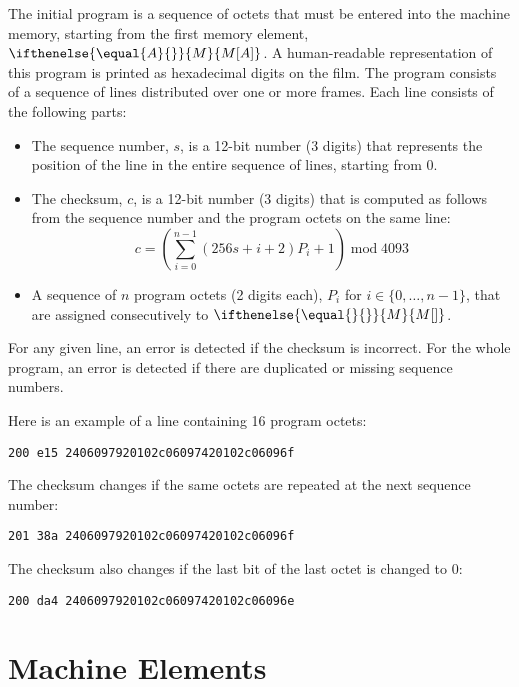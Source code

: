 \documentclass[a4paper,12pt]{article}
\newcommand{\MEM}[1]{\ifthenelse{\equal{#1}{}}{M}{M[#1]}}
\newcommand{\range}[2]{\{#1,\ldots,#2\}}
\DeclareMathOperator{\MOD}{mod}
\newcommand{\modulo}[2]{#1 \MOD #2}
\theoremstyle{definition}
\begin{document}
The initial program is a sequence of octets that must be entered into the machine memory, starting from the first memory element, $\MEM{A}$.
A human-readable representation of this program is printed as hexadecimal digits on the film.
The program consists of a sequence of lines distributed over one or more frames.
Each line consists of the following parts:
\begin{itemize}
\item The sequence number, $s$, is a 12-bit number (3 digits) that represents the position of the line in the entire sequence of lines, starting from 0.
\item The checksum, $c$, is a 12-bit number (3 digits) that is computed as follows from the sequence number and the program octets on the same line:
  \[ c = \modulo{\left ( \sum_{i=0}^{n-1} (256 s + i + 2) P_i + 1 \right )}{4093} \]
\item A sequence of $n$ program octets (2 digits each), $P_i$ for $i \in \range{0}{n-1}$, that are assigned consecutively to $\MEM{}$.
\end{itemize}
For any given line, an error is detected if the checksum is incorrect.
For the whole program, an error is detected if there are duplicated or missing sequence numbers.

Here is an example of a line containing 16 program octets:
\begin{verbatim}
200 e15 2406097920102c06097420102c06096f
\end{verbatim}
The checksum changes if the same octets are repeated at the next sequence number:
\begin{verbatim}
201 38a 2406097920102c06097420102c06096f
\end{verbatim}
The checksum also changes if the last bit of the last octet is changed to 0:
\begin{verbatim}
200 da4 2406097920102c06097420102c06096e
\end{verbatim}

\section{Machine Elements}
\label{sec:machine-elements}
\end{document}
